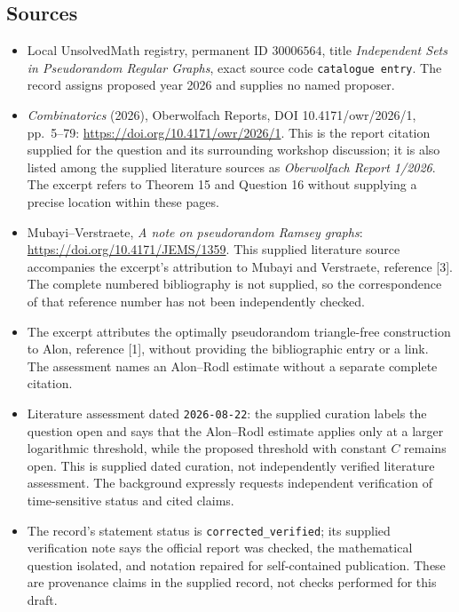 \documentclass[11pt]{article}
\begin{document}
\subsection{Sources}
\begin{itemize}
\item Local UnsolvedMath registry, permanent ID \(30006564\), title \emph{Independent Sets in Pseudorandom Regular Graphs}, exact source code \texttt{catalogue entry}. The record assigns proposed year 2026 and supplies no named proposer.
\item \emph{Combinatorics} (2026), Oberwolfach Reports, DOI 10.4171/owr/2026/1, pp.~5--79: \url{https://doi.org/10.4171/owr/2026/1}. This is the report citation supplied for the question and its surrounding workshop discussion; it is also listed among the supplied literature sources as \emph{Oberwolfach Report 1/2026}. The excerpt refers to Theorem 15 and Question 16 without supplying a precise location within these pages.
\item Mubayi--Verstraete, \emph{A note on pseudorandom Ramsey graphs}: \url{https://doi.org/10.4171/JEMS/1359}. This supplied literature source accompanies the excerpt's attribution to Mubayi and Verstraete, reference [3]. The complete numbered bibliography is not supplied, so the correspondence of that reference number has not been independently checked.
\item The excerpt attributes the optimally pseudorandom triangle-free construction to Alon, reference [1], without providing the bibliographic entry or a link. The assessment names an Alon--Rodl estimate without a separate complete citation.
\item Literature assessment dated \texttt{2026-08-22}: the supplied curation labels the question open and says that the Alon--Rodl estimate applies only at a larger logarithmic threshold, while the proposed threshold with constant \(C\) remains open. This is supplied dated curation, not independently verified literature assessment. The background expressly requests independent verification of time-sensitive status and cited claims.
\item The record's statement status is \texttt{corrected\_verified}; its supplied verification note says the official report was checked, the mathematical question isolated, and notation repaired for self-contained publication. These are provenance claims in the supplied record, not checks performed for this draft.
\end{itemize}
\end{document}
